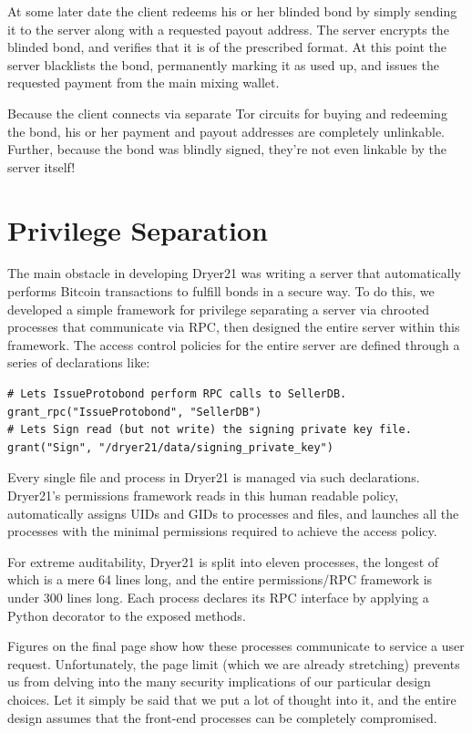 \documentclass[12pt]{article}
\begin{document}
At some later date the client redeems his or her blinded bond by simply sending it to the server along with a requested payout address.
The server encrypts the blinded bond, and verifies that it is of the prescribed format.
At this point the server blacklists the bond, permanently marking it as used up, and issues the requested payment from the main mixing wallet.

Because the client connects via separate Tor circuits for buying and redeeming the bond, his or her payment and payout addresses are completely unlinkable.
Further, because the bond was blindly signed, they're not even linkable by the server itself!

\section{Privilege Separation}
The main obstacle in developing Dryer21 was writing a server that automatically performs Bitcoin transactions to fulfill bonds in a secure way.
To do this, we developed a simple framework for privilege separating a server via chrooted processes that communicate via RPC, then designed the entire server within this framework.
The access control policies for the entire server are defined through a series of declarations like:
\begin{Verbatim}
# Lets IssueProtobond perform RPC calls to SellerDB.
grant_rpc("IssueProtobond", "SellerDB")
# Lets Sign read (but not write) the signing private key file.
grant("Sign", "/dryer21/data/signing_private_key")
\end{Verbatim}
Every single file and process in Dryer21 is managed via such declarations.
Dryer21's permissions framework reads in this human readable policy, automatically assigns UIDs and GIDs to processes and files, and launches all the processes with the minimal permissions required to achieve the access policy.

For extreme auditability, Dryer21 is split into eleven processes, the longest of which is a mere 64 lines long, and the entire permissions/RPC framework is under 300 lines long.
Each process declares its RPC interface by applying a Python decorator to the exposed methods.

Figures on the final page show how these processes communicate to service a user request.
Unfortunately, the page limit (which we are already stretching) prevents us from delving into the many security implications of our particular design choices.
Let it simply be said that we put a lot of thought into it, and the entire design assumes that the front-end processes can be completely compromised.
\end{document}
